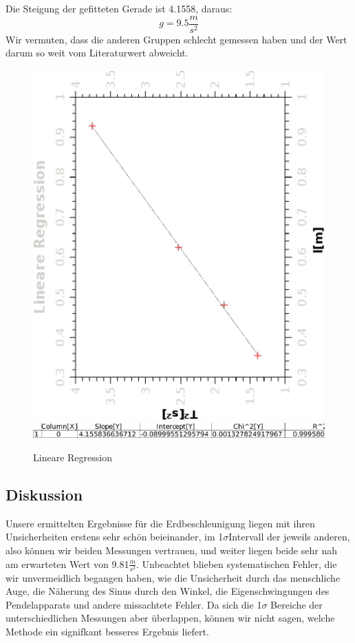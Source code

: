 \documentclass{article}
\begin{document}
 Die Steigung der gefitteten Gerade ist 4.1558, daraus:
 \begin{equation}
 g=9.5 \frac{m}{s^2}
 \end{equation}
 Wir vermuten, dass die anderen Gruppen schlecht gemessen haben und der Wert darum so weit vom Literaturwert abweicht.
\begin{figure}


\centering
\includegraphics[scale=0.8,angle=-90]{LinearReg.eps} \\
\includegraphics[scale=0.5,angle=0]{regressiondata.eps}
\caption{Lineare Regression}

\end{figure}
\subsection{Diskussion}
Unsere ermittelten Ergebnisse für die Erdbeschleunigung liegen mit ihren Unsicherheiten erstens sehr schön beieinander, im 1$\sigma$Intervall der jeweils anderen, also können wir beiden Messungen vertrauen, und weiter liegen beide sehr nah am erwarteten Wert von 9.81$\frac{m}{s^2}$. Unbeachtet blieben systematischen Fehler, die wir unvermeidlich begangen haben, wie die Unsicherheit durch das menschliche Auge, die Näherung des Sinus durch den Winkel, die Eigenschwingungen des Pendelapparats und andere missachtete Fehler. Da sich die 1$\sigma$ Bereiche der unterschiedlichen Messungen aber überlappen, können wir nicht sagen, welche Methode ein signifkant besseres Ergebnis liefert.
\end{document}
